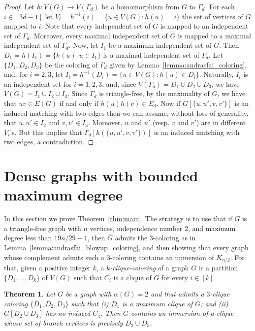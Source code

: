 \documentclass[a4paper,12pt]{article}
\newtheorem{theorem}{Theorem}
\newcommand{\Gcompl}{\overline{G}}
\begin{document}
\begin{proof}
	Let \(h \colon V(G) \to V(\Gamma_d)\) be a homomorphism from \(G\) to \(\Gamma_d\).
	For each \(i\in [3d-1]\) let \(V_i = h^{-1}(i) = \{u\in V(G) : h(u) = i\}\)
	the set of vertices of \(G\) mapped to \(i\).
	Note that every independent set of \(G\) is mapped to an independent set of \(\Gamma_d\).
	Moreover, every maximal independent set of \(G\) is mapped to a maximal independent set of \(\Gamma_d\).
	Now, let \(I_1\) be a maximum independent set of \(G\).
	Then \(D_1 = h(I_1) = \{h(u) : u \in I_1\}\) is a maximal independent set of \(\Gamma_d\).
	Let \(\{D_1,D_2,D_3\}\) be the coloring of \(\Gamma_d\) given by Lemma~\ref{lemma:andrasfai_coloring},
	and, for \(i = 2,3\), let \(I_i = h^{-1}(D_i) = \{u \in V(G) : h(u) \in D_i\}\).
	Naturally, \(I_i\) is an independent set for \(i = 1,2,3\),
	and, since \(V(\Gamma_d) = D_1\cup D_2\cup D_3\),
	we have \(V(G) = I_1 \cup I_2 \cup I_3\).
	Since \(\Gamma_d\) is triangle-free,
	by the maximality of \(G\), 
	we have that \(uv\in E(G)\) if and only if \(h(u)h(v)\in E_d\).
	Now if \(G[\{u,u',v,v'\}]\) is an induced matching with two edges
	then we can assume, without loss of generality,
	that \(u,u' \in I_2\) and \(v,v'\in I_3\).
	Moreover, \(u\) and \(u'\) (resp. \(v\) and \(v'\)) are in different \(V_i\)'s.
	But this implies that \(\Gamma_d[h(\{u,u',v,v'\})]\) is an induced matching with two edges,
	a contradiction.
\end{proof}


\section{Dense graphs with bounded maximum degree}\label{sec:main-result}

In this section we prove Theorem~\ref{thm:main}.
The strategy is to use that if \(G\) is a triangle-free graph with \(n\) vertices,
independence number \(2\), and maximum degree less than \(19n/29 - 1\),
then \(\Gcompl\) admits the \(3\)-coloring as in Lemma~\ref{lemma:andrasfai_blowup_coloring},
and then showing that every graph whose complement admits such a \(3\)-coloring
contains an immersion of \(K_{n/2}\).
For that, given a positive integer \(k\),
a \emph{\(k\)-clique-coloring} of a graph \(G\) is a partition \(\{D_1,\ldots, D_k\}\) of \(V(G)\)
such that \(C_i\) is a clique of \(G\) for every \(i\in[k]\).

\begin{theorem}\label{thm:graphs_with_special_clique_coloring}
	Let \(G\) be a graph with \(\alpha(G) = 2\)
	and that admits a \(3\)-clique coloring \(\{D_1,D_2,D_3\}\) such that
	(i) \(D_1\) is a maximum clique of \(G\); and
	(ii) \(G[D_2\cup D_3]\) has no induced \(C_4\).
	Then \(G\) contains an immersion of a clique whose set of branch vertices is precisely \(D_2\cup D_3\).
\end{theorem}
\end{document}
